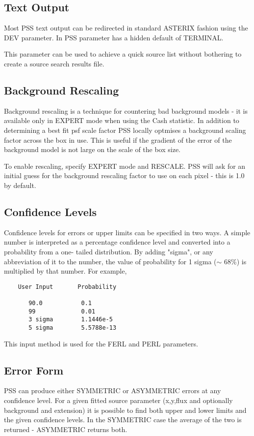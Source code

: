 \documentclass{book}
\renewcommand{\_}{{\tt\char'137}}     %
\begin{document}
\subsection{Text Output}
Most PSS text output can be redirected in standard ASTERIX
fashion using the DEV parameter. In PSS parameter has a hidden
default of TERMINAL.

This parameter can be used to achieve a quick source list without
bothering to create a source search results file.
\subsection{Background Rescaling}
Background rescaling is a technique for countering bad background
models - it is available only in EXPERT mode when using the Cash
statistic. In addition to determining a best fit psf scale factor
PSS locally optmises a background scaling factor across the box in
use. This is useful if the gradient of the error of the background
model is not large on the scale of the box size.

To enable rescaling, specify EXPERT mode and RESCALE. PSS will ask
for an initial guess for the background rescaling factor to use on
each pixel - this is 1.0 by default.

\subsection{Confidence Levels}
Confidence levels for errors or upper limits can be specified
in two ways. A simple number is interpreted as a percentage
confidence level and converted into a probability from a one-
tailed distribution. By adding "sigma", or any abbreviation
of it to the number, the value of probability for 1 sigma
($\sim$ 68\%) is multiplied by that number. For example,

\begin{verbatim}
    User Input       Probability

       90.0           0.1
       99             0.01
       3 sigma        1.1446e-5
       5 sigma        5.5788e-13
 \end{verbatim}
This input method is used for the FERL and PERL parameters.

\subsection{Error Form}
PSS can produce either SYMMETRIC or ASYMMETRIC errors at any
confidence level. For a given fitted source parameter (x,y,flux
and optionally background and extension) it is possible to find
both upper and lower limits and the given confidence levels. In
the SYMMETRIC case the average of the two is returned - ASYMMETRIC
returns both.
\end{document}
